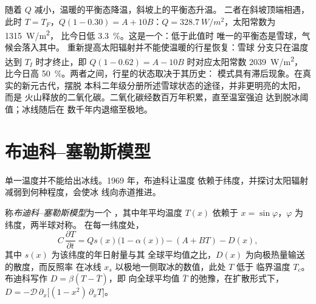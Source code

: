 \begin{omfigure}
\par{}\label{fig:b3:climate-models:zero-d}
\end{omfigure}

随着 $Q$ 减小，温暖的平衡态降温，斜坡上的平衡态升温。
二者在斜坡顶端相遇，此时 $T = T_F$，$Q(1 - 0.30) = A +
10B$：$Q = \qty{328.7}{W/m^2}$，太阳常数为 \qty{1315}{W/m^2}，
比今日低 \qty{3.3}{\percent}。这是一个：低于此值时
唯一的平衡态是雪球，气候会落入其中。
重新提高太阳辐射并不能使温暖的行星恢复：雪球
分支只在温度达到 $T_I$ 时才终止，即 $Q(1 - 0.62) = A -
10B$ 时对应太阳常数 \qty{2039}{W/m^2}，
比今日高 \qty{50}{\percent}。两者之间，行星的状态取决于其历史：
模式具有滞后现象。在真实的新元古代，摆脱
本科二年级分册所述雪球状态的途径，并非更明亮的太阳，而是
火山释放的二氧化碳。二氧化碳经数百万年积累，直至温室强迫
达到脱冰阈值；冰线随后在
数千年内退缩至极地。

\section{布迪科–塞勒斯模型}\label{sec:b3:climate-models:budyko-sellers}

单一温度并不能给出冰线。1969 年，布迪科让温度
依赖于纬度，并探讨太阳辐射减弱到何种程度，会使冰
线向赤道推进。

\begin{definition}\label{def:b3:climate-models:budyko-sellers}
称\emph{布迪科–塞勒斯模型}为一个
，其中年平均温度 $T(x)$ 依赖于
$x = \sin\varphi$，$\varphi$ 为纬度，两半球对称。
在每一纬度处，
\[
C\,\frac{\partial T}{\partial t} = Qs(x)\big(1 - \alpha(x)\big) - (A + BT) - D(x) ,
\]
其中 $s(x)$ 为该纬度的年日射量与其
全球平均值之比，$D(x)$ 为向极热量输送的散度，而反照率
在冰线 $x_s$ 以极地一侧取冰的数值，此处 $T$ 低于
临界温度 $T_c$。布迪科写作 $D = \beta(T - \bar T)$，即
向全球平均值 $\bar T$ 的弛豫，在扩散形式下，$D =
-\mathcal D\,\partial_x\big[(1 - x^2)\,\partial_xT\big]$。
\end{definition}

